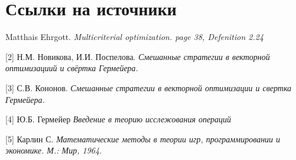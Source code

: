
\section{Ссылки на источники}
\begin{flushleft}
[1] Matthais Ehrgott. \textit{Multicriterial optimization. page 38, Defenition 2.24}

[2] Н.М. Новикова, И.И. Поспелова. \textit{Смешанные стратегии в векторной оптимизациий и свёртка Гермейера.}

[3] С.В. Кононов. \textit{Смешанные стратегии в векторной оптимизации и свертка Гермейера.}

[4] Ю.Б. Гермейер \textit{Введение в теорию исслежования операций}

[5] Карлин С. \textit{Математические методы в теории игр, программировании и экономике. М.: Мир, 1964}.


\end{flushleft}
